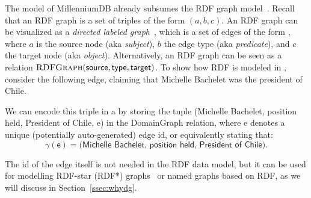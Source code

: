 

The \data model of MillenniumDB already subsumes the RDF graph model~\cite{CyganiakWL14}. Recall that an RDF graph is a set of triples of the form $(a,b,c)$. An RDF graph can be visualized as a \textit{directed labeled graph}~\cite{AnglesABHRV17,MendelzonW89}, which is a set of edges of the form , where $a$ is the source node (aka \textit{subject}), $b$ the edge type (aka \textit{predicate}), and $c$ the target node (aka \textit{object}). Alternatively, an RDF graph can be seen as a relation $\textsc{RDFGraph}(\textsf{source},\textsf{type},\textsf{target})$. To show how RDF is modeled in \datas, consider the following edge, claiming that Michelle Bachelet was the president of Chile.%

\medskip
\begin{center}
\end{center}
\medskip

\noindent
We can encode this triple in a \data by storing the tuple \textsf{(Michelle Bachelet, position held, President of Chile, e)} in the \textsf{DomainGraph} relation, where \textsf{e} denotes a unique (potentially auto-generated) edge id, or equivalently stating that:
$$\gamma(\textsf{e}) = \textsf{(Michelle Bachelet, position held, President of Chile)}.$$

\noindent
The id of the edge itself is not needed in the RDF data model, but it can be used for modelling RDF-star (RDF*) graphs~\cite{Hartig17,Hartig21} or named graphs based on RDF, as we will discuss in Section~\ref{ssec:whydg}.


